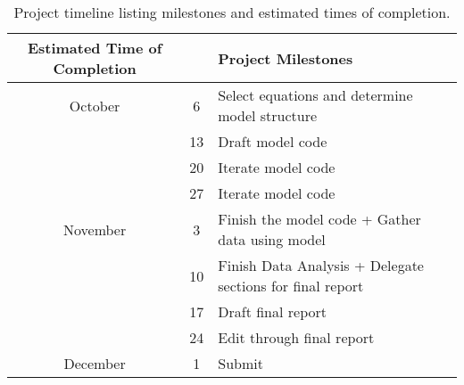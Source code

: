 \documentclass{article}
\begin{document}
\begin{table}[h!]
    \centering
    \begin{tabular}{|c|c|p{8cm}|}
        \hline
        \textbf{Estimated Time of Completion} &  & \textbf{Project Milestones} \\
        \hline
        October & 6  & Select equations and determine model structure \\
        \hline
                & 13 & Draft model code \\
        \hline
                & 20 & Iterate model code \\
        \hline
                & 27 & Iterate model code \\
        \hline
        November & 3  & Finish the model code + Gather data using model \\
        \hline
                & 10 & Finish Data Analysis + Delegate sections for final report \\
        \hline
                & 17 & Draft final report \\
        \hline
                & 24 & Edit through final report \\
        \hline
        December & 1  & Submit \\
        \hline
    \end{tabular}
    \caption{Project timeline listing milestones and estimated times of completion.}
    \label{tab:placeholder}
\end{table}

\printbibliography
\end{document}
